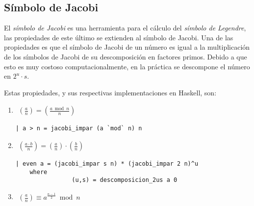 \documentclass[10pt,spanish]{article}
\begin{document}
\subsection{\textcolor{rojo}Símbolo de Jacobi}
El \textit{\textcolor{rojo}{símbolo de Jacobi}} es una herramienta para el cálculo del \textit{\textcolor{rojo}{símbolo de Legendre}}, las propiedades de este último se extienden al símbolo de Jacobi. Una de las propiedades es que el símbolo de Jacobi de un número es igual a la multiplicación de los símbolos de Jacobi de su descomposición en factores primos. Debido a que esto es muy costoso computacionalmente, en la práctica se descompone el número en $2^u \cdot s$.

Estas propiedades, y sus respectivas implementaciones en Haskell, son:

\begin{enumerate}[1.]
\item 
\begin{equation*}
    \begin{aligned}
    \left( \frac{a}{n} \right) = \left( \frac{a \bmod n}{n} \right)
    \end{aligned}
    \phantom{\hspace{18cm}}
\end{equation*}

\begin{verbatim}
| a > n = jacobi_impar (a `mod` n) n 
\end{verbatim}

\item 
\begin{equation*}
    \begin{aligned}
    \left( \frac{a \cdot b}{n} \right) = \left( \frac{a}{n} \right) \cdot \left( \frac{b}{n} \right)
    \end{aligned}
    \phantom{\hspace{18cm}}
\end{equation*}

\begin{verbatim}
| even a = (jacobi_impar s n) * (jacobi_impar 2 n)^u
    where
                (u,s) = descomposicion_2us a 0

\end{verbatim}

\item
\begin{equation*}
    \begin{aligned}
    \left( \frac{a}{n} \right) \equiv a^{\frac{n-1}{2}} \bmod n
    \end{aligned}
    \phantom{\hspace{18cm}}
\end{equation*}


\end{enumerate}
\end{document}
